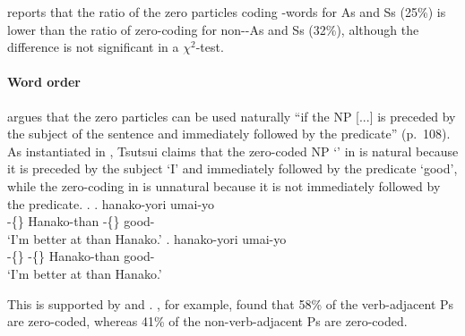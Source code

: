  reports that
the ratio of the zero particles coding -words for As and Ss (25\%) is lower than the ratio of zero-coding for non--As and Ss (32\%),
although the difference is not significant in a $\chi^{2}$-test.



\paragraph{Word order}

 argues that
the zero particles can be used naturally
``if the NP [...] is preceded by the subject of the sentence and immediately followed by the predicate'' (p.~108).
As instantiated in \Next,
Tsutsui claims that the zero-coded NP  `' in \Next[a] is natural
because it is preceded by the subject  `I' and immediately followed by the predicate  `good',
while the zero-coding in \Next[b] is unnatural because
it is not immediately followed by the predicate.
%
\ex.
 \ag.  hanako-yori  umai-yo \\
      -\{\} Hanako-than -\{\} good- \\
      `I'm better at  than Hanako.'
 \bg.   hanako-yori umai-yo \\
      -\{\} -\{\} Hanako-than good- \\
      `I'm better at  than Hanako.'
      \hfill{\cite[110]{tsutsui84}}

This is supported by  and .
, for example, found that
58\% of the verb-adjacent Ps are zero-coded,
whereas 41\% of the non-verb-adjacent Ps are zero-coded.


